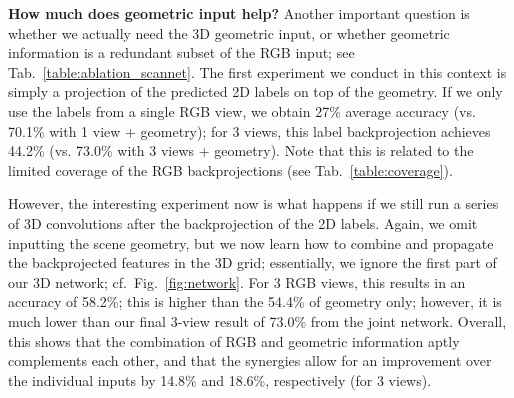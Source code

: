 \vspace{0.2cm}\noindent
\textbf{How much does geometric input help?}
Another important question is whether we actually need the 3D geometric input, or whether geometric information is a redundant subset of the RGB input; see Tab.~\ref{table:ablation_scannet}.
The first experiment we conduct in this context is simply a projection of the predicted 2D labels on top of the geometry.
If we only use the labels from a single RGB view, we obtain 27\%  average accuracy (vs. 70.1\% with 1 view + geometry); for 3 views, this label backprojection achieves 44.2\% (vs. 73.0\% with 3 views + geometry). 
Note that this is related to the limited coverage of the RGB backprojections (see Tab.~\ref{table:coverage}).

However, the interesting experiment now is what happens if we still run a series of 3D convolutions after the backprojection of the 2D labels.
Again, we omit inputting the scene geometry, but we now learn how to combine and propagate the backprojected features in the 3D grid; essentially, we ignore the first part of our 3D network; cf.~Fig.~\ref{fig:network}.
For 3 RGB views, this results in an accuracy of 58.2\%; this is higher than the 54.4\% of geometry only; however, it is much lower than our final 3-view result of 73.0\% from the joint network.
Overall, this shows that the combination of RGB and geometric information aptly complements each other, and that the synergies allow for an improvement over the individual inputs by 14.8\% and 18.6\%, respectively (for 3 views).



